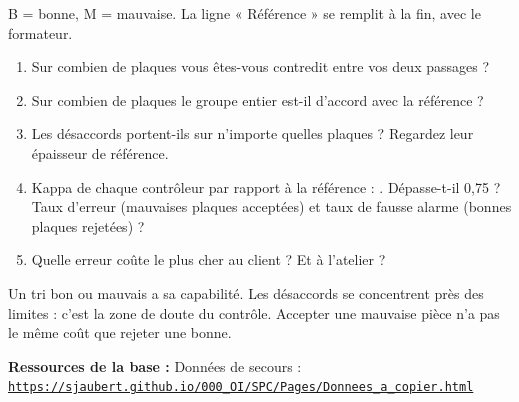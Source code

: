 \documentclass[10pt,a4paper]{article}
\begin{document}
\par{\small B = bonne, M = mauvaise. La ligne « Référence » se remplit à la fin, avec le formateur.}\par
{}
\begin{enumerate}[label=\textcolor{cyan}{\textbf{Q\arabic*.}},leftmargin=22pt]
\item Sur combien de plaques vous êtes-vous contredit entre vos deux passages ?\reponse[1]
\item Sur combien de plaques le groupe entier est-il d'accord avec la référence ?\reponse[1]
\item Les désaccords portent-ils sur n'importe quelles plaques ? Regardez leur épaisseur de référence.\reponse[1]
\item Kappa de chaque contrôleur par rapport à la référence : \champ{14mm}. Dépasse-t-il 0,75 ? Taux d'erreur (mauvaises plaques acceptées) et taux de fausse alarme (bonnes plaques rejetées) ?\reponse[1]
\item Quelle erreur coûte le plus cher au client ? Et à l'atelier ?\reponse[1]
\end{enumerate}
\begin{tcolorbox}[retenir]Un tri bon ou mauvais a sa capabilité. Les désaccords se concentrent près des limites : c'est la zone de doute du contrôle. Accepter une mauvaise pièce n'a pas le même coût que rejeter une bonne.\end{tcolorbox}
\vfill{\footnotesize\color{uimm}\textbf{Ressources de la base :} Données de secours : \href{https://sjaubert.github.io/000_OI/SPC/Pages/Donnees_a_copier.html\#tri20}{\nolinkurl{https://sjaubert.github.io/000_OI/SPC/Pages/Donnees_a_copier.html}}}
\end{document}
